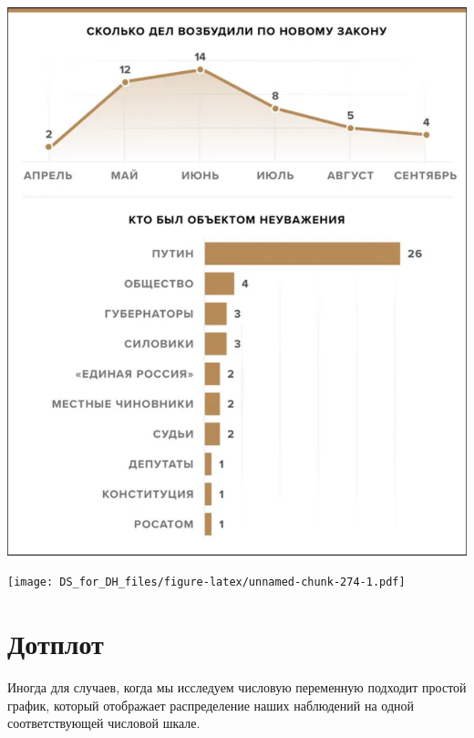 \documentclass[
]{book}
\newenvironment{Shaded}{\begin{snugshade}}{\end{snugshade}}
\newcommand{\DataTypeTok}[1]{\textcolor[rgb]{0.13,0.29,0.53}{#1}}
\newcommand{\KeywordTok}[1]{\textcolor[rgb]{0.13,0.29,0.53}{\textbf{#1}}}
\newcommand{\NormalTok}[1]{#1}
\newcommand{\OperatorTok}[1]{\textcolor[rgb]{0.81,0.36,0.00}{\textbf{#1}}}
\newcommand{\StringTok}[1]{\textcolor[rgb]{0.31,0.60,0.02}{#1}}
\begin{document}
\includegraphics{images/visualisation_task.png}

\texttt{[image: DS\_for\_DH\_files/figure-latex/unnamed-chunk-274-1.pdf]}

\hypertarget{ux434ux43eux442ux43fux43bux43eux442}{%
\section{Дотплот}\label{ux434ux43eux442ux43fux43bux43eux442}}

Иногда для случаев, когда мы исследуем числовую переменную подходит простой график, который отображает распределение наших наблюдений на одной соответствующей числовой шкале.

\begin{Shaded}
\end{Shaded}
\end{document}
